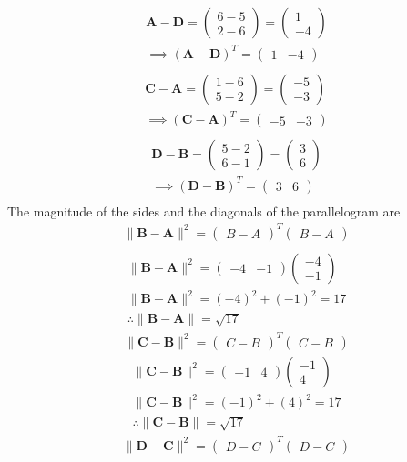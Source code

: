 \documentclass{beamer}
\theoremstyle{remark}
\newcommand{\myvec}[1]{\ensuremath{\begin{pmatrix}#1\end{pmatrix}}}
\let\vec\mathbf
\numberwithin{equation}{section}
\begin{document}
            \begin{align}
            \vec{A-D}=\myvec{6-5\\2-6}=\myvec{1\\-4}\\
            \implies \vec{(A-D)}^T=\myvec{1 & -4}\\
            \end{align}
            \begin{align}
            \vec{C-A}=\myvec{1-6\\5-2}=\myvec{-5\\-3}\\
            \implies \vec{(C-A)}^T=\myvec{-5 & -3}\\
            \end{align}
            \begin{align}
            \vec{D-B}=\myvec{5-2\\6-1}=\myvec{3\\6}\\
            \implies \vec{(D-B)}^T=\myvec{3 & 6}\\
        \end{align} 
        The magnitude of the sides and the diagonals of the parallelogram are\\
        \begin{align}
            \|\vec{B-A}\|^2=\myvec{B-A}^T\myvec{B-A}\\
        \end{align}
    \begin{align}
            \|\vec{B-A}\|^2=\myvec{-4 & -1}\myvec{-4\\-1}\\
            \|\vec{B-A}\|^2=(-4)^2+(-1)^2=17\\
            \therefore \|\vec{B-A}\|=\sqrt{17}
        \end{align}
        \begin{align}
            \|\vec{C-B}\|^2=\myvec{C-B}^T\myvec{C-B}
        \end{align}
        \begin{align}
            \|\vec{C-B}\|^2=\myvec{-1 & 4}\myvec{-1\\4}\\
            \|\vec{C-B}\|^2=(-1)^2+(4)^2=17\\
            \therefore \|\vec{C-B}\|=\sqrt{17}
        \end{align}
        \begin{align}
            \|\vec{D-C}\|^2=\myvec{D-C}^T\myvec{D-C}
        \end{align}
\end{document}
